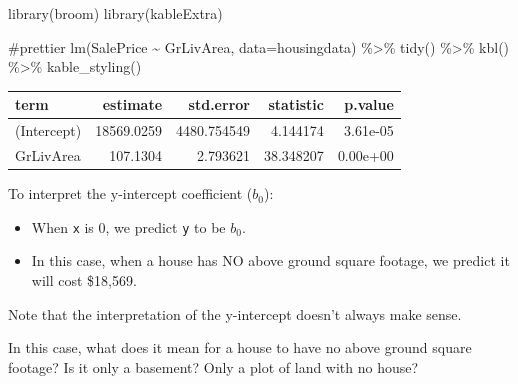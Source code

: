 \documentclass[
  letterpaper,
  DIV=11,
  numbers=noendperiod]{scrartcl}
\newenvironment{Shaded}{\begin{snugshade}}{\end{snugshade}}
\newcommand{\AttributeTok}[1]{\textcolor[rgb]{0.40,0.45,0.13}{#1}}
\newcommand{\CommentTok}[1]{\textcolor[rgb]{0.37,0.37,0.37}{#1}}
\newcommand{\FunctionTok}[1]{\textcolor[rgb]{0.28,0.35,0.67}{#1}}
\newcommand{\NormalTok}[1]{\textcolor[rgb]{0.00,0.23,0.31}{#1}}
\newcommand{\SpecialCharTok}[1]{\textcolor[rgb]{0.37,0.37,0.37}{#1}}
\providecommand{\tightlist}{%
  \setlength{\itemsep}{0pt}\setlength{\parskip}{0pt}}\usepackage{longtable,booktabs,array}
\begin{document}
\begin{Shaded}
\begin{Highlighting}[]
\FunctionTok{library}\NormalTok{(broom)}
\FunctionTok{library}\NormalTok{(kableExtra)}

\CommentTok{\#prettier}
\FunctionTok{lm}\NormalTok{(SalePrice }\SpecialCharTok{\textasciitilde{}}\NormalTok{ GrLivArea, }\AttributeTok{data=}\NormalTok{housingdata) }\SpecialCharTok{\%\textgreater{}\%} 
  \FunctionTok{tidy}\NormalTok{() }\SpecialCharTok{\%\textgreater{}\%} 
  \FunctionTok{kbl}\NormalTok{() }\SpecialCharTok{\%\textgreater{}\%} 
  \FunctionTok{kable\_styling}\NormalTok{()}
\end{Highlighting}
\end{Shaded}

\begin{table}
\centering
\begin{tabular}[t]{l|r|r|r|r}
\hline
term & estimate & std.error & statistic & p.value\\
\hline
(Intercept) & 18569.0259 & 4480.754549 & 4.144174 & 3.61e-05\\
\hline
GrLivArea & 107.1304 & 2.793621 & 38.348207 & 0.00e+00\\
\hline
\end{tabular}
\end{table}

To interpret the y-intercept coefficient (\(b_0\)):

\begin{itemize}
\tightlist
\item
  When \texttt{x} is 0, we predict \texttt{y} to be \(b_0\).
\item
  In this case, when a house has NO above ground square footage, we
  predict it will cost \$18,569.
\end{itemize}

\begin{tcolorbox}[enhanced jigsaw, colback=white, breakable, colframe=quarto-callout-tip-color-frame, colbacktitle=quarto-callout-tip-color!10!white, left=2mm, toptitle=1mm, opacitybacktitle=0.6, arc=.35mm, rightrule=.15mm, opacityback=0, bottomtitle=1mm, coltitle=black, titlerule=0mm, title=\textcolor{quarto-callout-tip-color}{\faLightbulb}\hspace{0.5em}{Tip}, bottomrule=.15mm, toprule=.15mm, leftrule=.75mm]

Note that the interpretation of the y-intercept doesn't always make
sense.

In this case, what does it mean for a house to have no above ground
square footage? Is it only a basement? Only a plot of land with no
house?

\end{tcolorbox}
\end{document}
